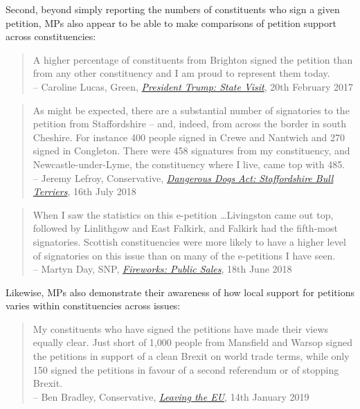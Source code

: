 \documentclass[12pt]{article}
\begin{document}
Second, beyond simply reporting the numbers of constituents who sign a given petition, MPs also appear to be able to make comparisons of petition support across constituencies:

\begin{quote}
A higher percentage of constituents from Brighton signed the petition than from any other constituency and I am proud to represent them today. \\ 
-- Caroline Lucas, Green, \href{https://hansard.parliament.uk/commons/2017-02-20/debates/34847E5C-8B14-46E6-8251-AE99526CC011/PresidentTrumpStateVisit}{\emph{President Trump: State Visit}}, 20th February 2017
\end{quote}

\begin{quote}
As might be expected, there are a substantial number of signatories to the petition from Staffordshire -- and, indeed, from across the border in south Cheshire. For instance 400 people signed in Crewe and Nantwich and 270 signed in Congleton. There were 458 signatures from my constituency, and Newcastle-under-Lyme, the constituency where I live, came top with 485. \\ 
-- Jeremy Lefroy, Conservative, \href{https://hansard.parliament.uk/commons/2018-07-16/debates/51B3E06E-CDFE-45DD-BD6B-D9B304DA4298/DangerousDogsActStaffordshireBullTerriers}{\emph{Dangerous Dogs Act: Staffordshire Bull Terriers}}, 16th July 2018
\end{quote}

\begin{quote}
When I saw the statistics on this e-petition \ldots Livingston came out top, followed by Linlithgow and East Falkirk, and Falkirk had the fifth-most signatories. Scottish constituencies were more likely to have a higher level of signatories on this issue than on many of the e-petitions I have seen. \\ 
-- Martyn Day, SNP, \href{https://hansard.parliament.uk/commons/2018-11-26/debates/C95047CD-F24E-44DA-BE73-FC571B014CEF/FireworksPublicSales}{\emph{Fireworks: Public Sales}}, 18th June 2018
\end{quote}


Likewise, MPs also demonstrate their awareness of how local support for petitions varies within constituencies across issues:

\begin{quote}
My constituents who have signed the petitions have made their views equally clear. Just short of 1,000 people from Mansfield and Warsop signed the petitions in support of a clean Brexit on world trade terms, while only 150 signed the petitions in favour of a second referendum or of stopping Brexit.  \\ 
-- Ben Bradley, Conservative, \href{https://hansard.parliament.uk/commons/2019-01-14/debates/694BA27D-566E-4F52-BC4B-8FC1ACA3F109/LeavingTheEU}{\emph{Leaving the EU}}, 14th January 2019
\end{quote}
\end{document}
